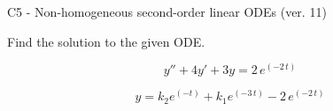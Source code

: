 \begin{exercise}
  \begin{exerciseTitle}C5 - Non-homogeneous second-order linear ODEs (ver. 11)\end{exerciseTitle}
  \begin{exerciseStatement}
    
Find the solution to the given ODE.

    
\[y''+4y'+3y = 2 \, e^{\left(-2 \, t\right)}\]

  \end{exerciseStatement}
  \begin{exerciseAnswer}
    
\[y= k_{2} e^{\left(-t\right)} + k_{1} e^{\left(-3 \, t\right)} - 2 \, e^{\left(-2 \, t\right)}\]

  \end{exerciseAnswer}
\end{exercise}
